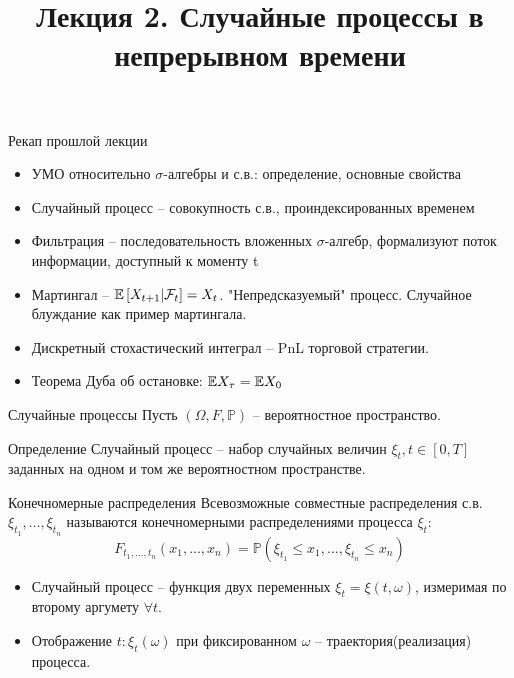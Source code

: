 \documentclass[aspectratio=169]{beamer}
\title[Случайные процессы]{Лекция 2. Случайные процессы в непрерывном времени} %
\begin{document}
\begin{frame}
\titlepage 
\end{frame}

\begin{frame}{Рекап прошлой лекции}
    \begin{itemize}
        \item УМО относительно $\sigma$-алгебры и с.в.: определение, основные свойства
        \item Случайный процесс -- совокупность с.в., проиндексированных временем
        \item Фильтрация -- последовательность вложенных $\sigma$-алгебр, формализуют поток информации, доступный к моменту t
        \item Мартингал -- $\mathbb{E} \left[ X_{t+1} | \mathcal{F}_t\right] = X_t$. "Непредсказуемый" процесс. Случайное блуждание как пример мартингала.
        \item Дискретный стохастический интеграл -- PnL торговой стратегии. 
        \item Теорема Дуба об остановке: $\mathbb{E} X_{\tau} = \mathbb{E} X_0$
    \end{itemize}
\end{frame}


\begin{frame}{Случайные процессы}
    Пусть $(\Omega, F, \mathbb{P})$ -- вероятностное пространство.
    \begin{block}{Определение}
    Случайный процесс -- набор случайных величин $\xi_t, t \in [0, T]$ заданных на одном и том же вероятностном пространстве.     
    \end{block}
    
    \begin{block}{Конечномерные распределения}
        Всевозможные совместные распределения с.в. $\xi_{t_1}, \ldots, \xi_{t_n}$ называются конечномерными распределениями процесса $\xi_t$:
        $$
            F_{t_1, \ldots, t_n} (x_1, \ldots, x_n) = \mathbb{P}(\xi_{t_1} \leq x_1, \ldots, \xi_{t_n} \leq x_n)
        $$
    \end{block}

    \begin{itemize}
        \item Случайный процесс -- функция двух переменных $\xi_t = \xi(t, \omega)$, измеримая по второму аргумету $\forall t$.
        \item Отображение $t : \xi_t(\omega)$ при фиксированном $\omega$ -- траектория(реализация) процесса.
    \end{itemize}
\end{frame}
\end{document}

